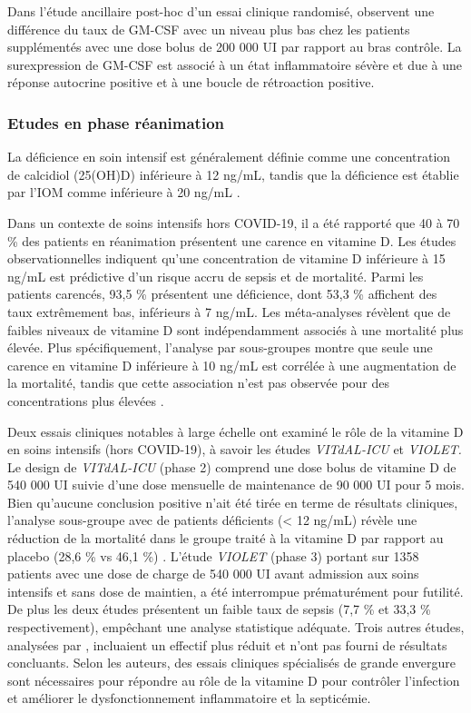 \documentclass[
  a4paper,
  DIV=11,
  numbers=noendperiod,
  listof=totoc]{scrreprt}
\begin{document}
Dans l'étude ancillaire post-hoc d'un essai clinique randomisé,
\textcite{Fernandes.2022} observent une différence du taux de GM-CSF
avec un niveau plus bas chez les patients supplémentés avec une dose
bolus de 200 000 UI par rapport au bras contrôle. La surexpression de
GM-CSF est associé à un état inflammatoire sévère et due à une réponse
autocrine positive et à une boucle de rétroaction positive.

\subsubsection{Etudes en phase
réanimation}\label{etudes-en-phase-ruxe9animation}

La déficience en soin intensif est généralement définie comme une
concentration de calcidiol (25(OH)D) inférieure à 12 ng/mL, tandis que
la déficience est établie par l'\ac{IOM} comme inférieure à 20 ng/mL
\autocite{Cutuli.2024}.

Dans un contexte de soins intensifs hors COVID-19, il a été rapporté que
40 à 70 \% des patients en réanimation présentent une carence en
vitamine D. Les études observationnelles indiquent qu'une concentration
de vitamine D inférieure à 15 ng/mL est prédictive d'un risque accru de
sepsis et de mortalité. Parmi les patients carencés, 93,5 \% présentent
une déficience, dont 53,3 \% affichent des taux extrêmement bas,
inférieurs à 7 ng/mL. Les méta-analyses révèlent que de faibles niveaux
de vitamine D sont indépendamment associés à une mortalité plus élevée.
Plus spécifiquement, l'analyse par sous-groupes montre que seule une
carence en vitamine D inférieure à 10 ng/mL est corrélée à une
augmentation de la mortalité, tandis que cette association n'est pas
observée pour des concentrations plus élevées \autocite{Cutuli.2024}.

Deux essais cliniques notables à large échelle ont examiné le rôle de la
vitamine D en soins intensifs (hors COVID-19), à savoir les études
\emph{VITdAL-ICU} et \emph{VIOLET.} Le design de \emph{VITdAL-ICU}
(phase 2) comprend une dose bolus de vitamine D de 540 000 UI suivie
d'une dose mensuelle de maintenance de 90 000 UI pour 5 mois. Bien
qu'aucune conclusion positive n'ait été tirée en terme de résultats
cliniques, l'analyse sous-groupe avec de patients déficients
(\textless{} 12 ng/mL) révèle une réduction de la mortalité dans le
groupe traité à la vitamine D par rapport au placebo (28,6 \% vs 46,1
\%) \autocite{Cutuli.2024}. L'étude \emph{VIOLET} (phase 3) portant sur
1358 patients avec une dose de charge de 540 000 UI avant admission aux
soins intensifs et sans dose de maintien, a été interrompue
prématurément pour futilité. De plus les deux études présentent un
faible taux de sepsis (7,7 \% et 33,3 \% respectivement), empêchant une
analyse statistique adéquate. Trois autres études, analysées par
\textcite{Cutuli.2024}, incluaient un effectif plus réduit et n'ont pas
fourni de résultats concluants. Selon les auteurs, des essais cliniques
spécialisés de grande envergure sont nécessaires pour répondre au rôle
de la vitamine D pour contrôler l'infection et améliorer le
dysfonctionnement inflammatoire et la septicémie.
\end{document}
